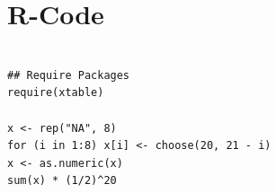 \documentclass[12pt]{article}\usepackage[]{graphicx}\usepackage[]{color}
\begin{document}
\section*{R-Code}
\begin{verbatim}

## Require Packages
require(xtable)

x <- rep("NA", 8)
for (i in 1:8) x[i] <- choose(20, 21 - i)
x <- as.numeric(x)
sum(x) * (1/2)^20



\end{verbatim}
\end{document}
